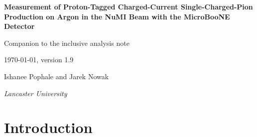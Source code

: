 \documentclass[11pt,a4paper]{article}
\newcommand{\uboone}{MicroBooNE}
\newcommand{\GeVc}{\,\text{GeV}\!/c}
\begin{document}
\begin{titlepage}
  \centering
  \vspace*{2cm}
  {\LARGE\bfseries Measurement of Proton-Tagged Charged-Current Single-Charged-Pion Production on
    Argon in the NuMI Beam with the \uboone{} Detector\par}
  \vspace{0.8cm}
  {\large Companion to the inclusive analysis note\par}
  \vspace{0.5cm}
  \vspace{0.5cm}
\today, {\large version 1.9}

  \vspace{1.5cm}
  {\large Ishanee Pophale and Jarek Nowak\par}
  \vspace{0.5cm}
  {\normalsize\itshape Lancaster University\par}
  \vspace{2cm}
  \begin{abstract}
    The inclusive CC$\pi^{\pm}$ measurement of the companion note is repeated on the subsample in which
    a proton candidate with $p_p>0.3\GeVc$ is also reconstructed. All results are extracted from
    pseudo-data. The proton gives access to the
    visible hadronic system: the proton momentum and direction, the pion--proton opening angle, a
    calorimetric hadronic-mass proxy and the transverse kinematic imbalance between the muon and the
    $\pi p$ system. The cross sections are averaged over the $\nu_\mu+\bar\nu_\mu$ flux integrated above
    $60$~MeV and extracted in the FHC, RHC and combined configurations with the Wiener-SVD machinery of
    the inclusive analysis, each with its additional-smearing matrix and covariance. The one-bin total
    cross section, $d\sigma/d\theta_p$ and $d\sigma/d\theta_{\pi p}$, and the combined-configuration
    $d^2\sigma/d\theta_p\,d\delta p_T$ are also obtained. The one-bin total carries a $41$--$43\%$
    uncertainty; ensembles of pseudo-experiments give pull widths of $0.89$--$1.04$.
  \end{abstract}
  \vfill
  \tableofcontents
\end{titlepage}

\section{Introduction}
\label{sec:pt_intro}
\end{document}
